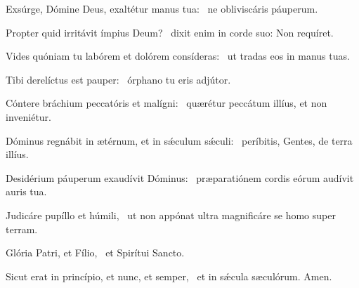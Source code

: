 \item Exsúrge, Dómine Deus, exaltétur manus tua:~\psstar{}  ne obliviscáris páuperum.
\item Propter quid irritávit ímpius Deum?~\psstar{} dixit enim in corde suo: Non requíret.
\item Vides quóniam tu labórem et dolórem consíderas:~\psstar{} ut tradas eos in manus tuas.
\item Tibi derelíctus est pauper:~\psstar{} órphano tu eris adjútor.
\item Cóntere bráchium peccatóris et malígni:~\psstar{} quærétur peccátum illíus, et non inveniétur.
\item Dóminus regnábit in ætérnum, et in sǽculum sǽculi:~\psstar{} períbitis, Gentes, de terra illíus.
\item Desidérium páuperum exaudívit Dóminus:~\psstar{} præparatiónem cordis eórum audívit auris tua.
\item Judicáre pupíllo et húmili,~\psstar{} ut non appónat ultra magnificáre se homo super terram.
\item Glória Patri, et Fílio,~\psstar{} et Spirítui Sancto.
\item Sicut erat in princípio, et nunc, et semper,~\psstar{} et in sǽcula sæculórum. Amen.
